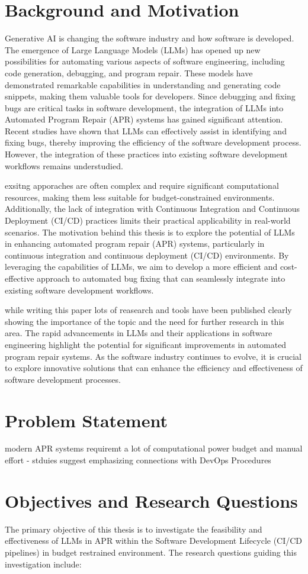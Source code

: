 \section{Background and Motivation}
Generative AI is changing the software industry and how software is developed. The emergence of Large Language Models (LLMs) has opened up new possibilities for automating various aspects of software engineering, including code generation, debugging, and program repair. These models have demonstrated remarkable capabilities in understanding and generating code snippets, making them valuable tools for developers.
Since debugging and fixing bugs are critical tasks in software development, the integration of LLMs into Automated Program Repair (APR) systems has gained significant attention. Recent studies have shown that LLMs can effectively assist in identifying and fixing bugs, thereby improving the efficiency of the software development process.
However, the integration of these practices into existing software development workflows remains understudied. 

exsitng apporaches are often complex and require significant computational resources, making them less suitable for budget-constrained environments. Additionally, the lack of integration with Continuous Integration and Continuous Deployment (CI/CD) practices limits their practical applicability in real-world scenarios.
The motivation behind this thesis is to explore the potential of LLMs in enhancing automated program repair (APR) systems, particularly in continuous integration and continuous deployment (CI/CD) environments. By leveraging the capabilities of LLMs, we aim to develop a more efficient and cost-effective approach to automated bug fixing that can seamlessly integrate into existing software development workflows.


while writing this paper lots of reasearch and tools have been published clearly showing the importance of the topic and the need for further research in this area. The rapid advancements in LLMs and their applications in software engineering highlight the potential for significant improvements in automated program repair systems. As the software industry continues to evolve, it is crucial to explore innovative solutions that can enhance the efficiency and effectiveness of software development processes.


\section{Problem Statement}
modern APR systems requiremt a lot of computational power budget and manual effort - stduies suggest emphasizing connections with DevOps Procedures \cite{puvvadiCodingAgentsComprehensive2025}

\section{Objectives and Research Questions}
The primary objective of this thesis is to investigate the feasibility and effectiveness of LLMs in APR within the Software Development Lifecycle (CI/CD pipelines) in budget restrained environment. The research questions guiding this investigation include: